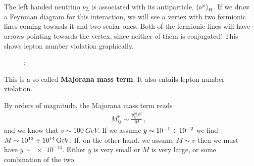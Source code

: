 \documentclass[main.tex]{subfiles}
\begin{document}
The left handed neutrino \(\nu_{L}\) is associated with its antiparticle, \(\qty(\nu^{c})_{R}\). 
If we draw a Feynman diagram for this interaction, we will see a vertex with two fermionic lines coming towards it and two scalar ones. 
Both of the fermionic lines will have arrows pointing towards the vertex, since neither of them is conjugated! This shows lepton number violation graphically. 
\begin{figure}[ht]
\centering
{};
\caption{}
\label{fig:majorana-lepton-number-violation}
\end{figure}

This is a so-called \textbf{Majorana mass term}.
It also entails lepton number violation. 










By orders of magnitude, the Majorana mass term reads 
%
\begin{align}
M_{ij}^{\nu } \sim \frac{y^{M}_{ij}v^2}{M}
\,,
\end{align}
%
and we know that \(v \sim \SI{100}{GeV}\). If we assume \(y \sim \num{e-1} \divisionsymbol \num{e-2}\) we find \(M \sim \num{e13} \divisionsymbol \SI{e14}{GeV}\). 
If, on the other hand, we assume \(M \sim v\) then we must have \(y \sim \num{e-13}\). Either \(y\) is very small or \(M\) is very large, or some combination of the two.  
\end{document}
